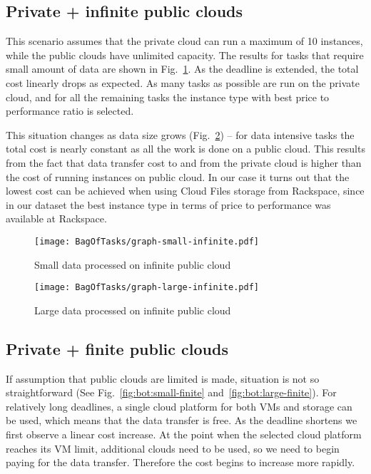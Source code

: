 {\subsection{Private + infinite public clouds}
\label{sec:bot:private-infinite} 
  This scenario assumes that the private cloud can run a maximum of 10 instances, while the public clouds have unlimited capacity. The results for tasks that require small amount of data are shown in Fig.~\ref{fig:bot:small-infinite}. As the deadline is extended, the total cost linearly drops as expected. As many tasks as possible are run on the private cloud, and for all the remaining tasks the instance type with best price to performance ratio is selected.
    
  This situation changes as data size grows (Fig.~\ref{fig:bot:large-infinite}) -- for data intensive tasks the total cost is nearly constant as all the work is done on a public cloud. This results from the fact that data transfer cost to and from the private cloud is higher than the cost of running instances on public cloud. In our case it turns out that the lowest cost can be achieved when using Cloud Files storage from Rackspace, since in our dataset the best instance type in terms of price to performance was available at Rackspace. 
        
  \begin{figure}[tb] 
     \centering
     \texttt{[image: BagOfTasks/graph-small-infinite.pdf]}
     \caption{Small data processed on infinite public cloud\label{fig:bot:small-infinite}}
     
  \end{figure}

  \begin{figure}[tb] 
     \centering
     \texttt{[image: BagOfTasks/graph-large-infinite.pdf]}
     \caption{Large data processed on infinite public cloud\label{fig:bot:large-infinite}}
  \end{figure}        
    
\subsection{Private + finite public clouds}
\label{sec:bot:private-finite}
    
  If assumption that public clouds are limited is made, situation is not so straightforward (See Fig.~\ref{fig:bot:small-finite} and~\ref{fig:bot:large-finite}). For relatively long deadlines, a single cloud platform for both VMs and storage can be used, which means that the data transfer is free. As the deadline shortens we first observe a linear cost increase. At the point when the selected cloud platform reaches its VM limit, additional clouds need to be used, so we need to begin paying for the data transfer. Therefore the cost begins to increase more rapidly.
  
}
